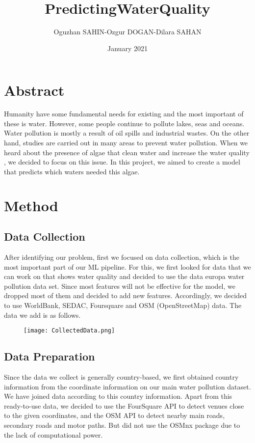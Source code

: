 \documentclass[]{article}
\title{PredictingWaterQuality}
\author{Oguzhan SAHIN-Ozgur DOGAN-Dilara SAHAN}
\date{January 2021}
\begin{document}
\maketitle

\section{Abstract}
Humanity have some fundamental needs for existing and the most important of these is water. However, some people continue to pollute lakes, seas and oceans. Water pollution is mostly a result of oil spills and industrial wastes. On the other hand, studies are carried out in many areas to prevent water pollution. When we heard about the presence of algae that clean water and increase the water quality , we decided to focus on this issue. In this project, we aimed to create a model that predicts which waters needed this algae.
\section{Method}
\subsection{Data Collection}
After identifying our problem, first we focused on data collection, which is the most important part of our ML pipeline. For this, we first looked for data that we can work on that shows water quality and decided to use the data europa water pollution data set. Since most features will not be effective for the model, we dropped most of them and decided to add new features. Accordingly, we decided to use WorldBank, SEDAC, Foursquare and OSM (OpenStreetMap) data. The data we add is as follows.

\begin{figure}[h]
    \centering
    \texttt{[image: CollectedData.png]}
\end{figure}
\subsection{Data Preparation}
Since the data we collect is generally country-based, we first obtained country information from the coordinate information on our main water pollution dataset. We have joined data according to this country information. Apart from this ready-to-use data, we decided to use the FourSquare API to detect venues close to the given coordinates, and the OSM API to detect nearby main roads, secondary roads and motor paths. But did not use the OSMnx package due to the lack of computational power.
\end{document}
